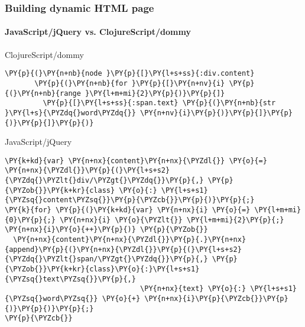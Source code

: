 \begin{frame}[fragile]
  \frametitle{Building dynamic HTML page}
  \framesubtitle{JavaScript/jQuery vs. ClojureScript/dommy}
\begin{block}{ClojureScript/dommy}
\begin{Verbatim}[commandchars=\\\{\}]
\PY{p}{(}\PY{n+nb}{node }\PY{p}{[}\PY{l+s+ss}{:div.content}
       \PY{p}{(}\PY{n+nb}{for }\PY{p}{[}\PY{n+nv}{i} \PY{p}{(}\PY{n+nb}{range }\PY{l+m+mi}{2}\PY{p}{)}\PY{p}{]}
         \PY{p}{[}\PY{l+s+ss}{:span.text} \PY{p}{(}\PY{n+nb}{str }\PY{l+s}{\PYZdq{}word\PYZdq{}} \PY{n+nv}{i}\PY{p}{)}\PY{p}{]}\PY{p}{)}\PY{p}{]}\PY{p}{)}
\end{Verbatim}
\end{block}

\pause

\begin{block}{JavaScript/jQuery}
\begin{Verbatim}[commandchars=\\\{\}]
\PY{k+kd}{var} \PY{n+nx}{content}\PY{n+nx}{\PYZdl{}} \PY{o}{=} \PY{n+nx}{\PYZdl{}}\PY{p}{(}\PY{l+s+s2}{\PYZdq{}\PYZlt{}div/\PYZgt{}\PYZdq{}}\PY{p}{,} \PY{p}{\PYZob{}}\PY{k+kr}{class} \PY{o}{:} \PY{l+s+s1}{\PYZsq{}content\PYZsq{}}\PY{p}{\PYZcb{}}\PY{p}{)}\PY{p}{;}
\PY{k}{for} \PY{p}{(}\PY{k+kd}{var} \PY{n+nx}{i} \PY{o}{=} \PY{l+m+mi}{0}\PY{p}{;} \PY{n+nx}{i} \PY{o}{\PYZlt{}} \PY{l+m+mi}{2}\PY{p}{;} \PY{n+nx}{i}\PY{o}{++}\PY{p}{)} \PY{p}{\PYZob{}}
  \PY{n+nx}{content}\PY{n+nx}{\PYZdl{}}\PY{p}{.}\PY{n+nx}{append}\PY{p}{(}\PY{n+nx}{\PYZdl{}}\PY{p}{(}\PY{l+s+s2}{\PYZdq{}\PYZlt{}span/\PYZgt{}\PYZdq{}}\PY{p}{,} \PY{p}{\PYZob{}}\PY{k+kr}{class}\PY{o}{:}\PY{l+s+s1}{\PYZsq{}text\PYZsq{}}\PY{p}{,}
                                \PY{n+nx}{text} \PY{o}{:} \PY{l+s+s1}{\PYZsq{}word\PYZsq{}} \PY{o}{+} \PY{n+nx}{i}\PY{p}{\PYZcb{}}\PY{p}{)}\PY{p}{)}\PY{p}{;}
\PY{p}{\PYZcb{}}
\end{Verbatim}
\end{block}
\end{frame}